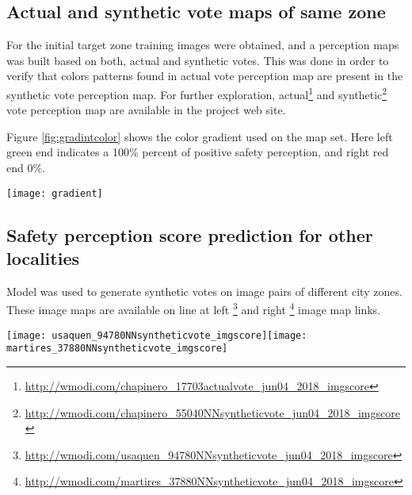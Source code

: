 \documentclass{llncs}
\begin{document}
\subsection{Actual and synthetic vote maps of same zone}
For the initial target zone training images were obtained, and a perception maps was built based on both, actual and synthetic votes. This was done in order to verify that colors patterns found in actual vote perception map are present in the synthetic vote perception map. For further exploration, actual\footnote{\href{http://wmodi.com/chapinero\_17703actualvote\_jun04\_2018\_imgscore}{http://wmodi.com/chapinero\_17703actualvote\_jun04\_2018\_imgscore}} and synthetic\footnote{\href{http://wmodi.com/chapinero\_55040NNsyntheticvote\_jun04\_2018\_imgscore}{http://wmodi.com/chapinero\_55040NNsyntheticvote\_jun04\_2018\_imgscore}} vote perception map are available in the project web site.

Figure \ref{fig:gradintcolor} shows the color gradient used on the map set. Here left green end indicates a 100\% percent of positive safety perception, and right red end 0\%. 

\begin{center}
	\centering
	\texttt{[image: gradient]}
	\label{fig:gradintcolor}
\end{center}

\subsection{Safety perception score prediction for other localities}
Model was used to generate synthetic votes on image pairs of different city zones. These image maps are available on line at left \footnote{\href{http://wmodi.com/usaquen\_94780NNsyntheticvote\_jun04\_2018\_imgscore}{http://wmodi.com/usaquen\_94780NNsyntheticvote\_jun04\_2018\_imgscore}} and right \footnote{\href{http://wmodi.com/martires\_37880NNsyntheticvote\_jun04\_2018\_imgscore}{http://wmodi.com/martires\_37880NNsyntheticvote\_jun04\_2018\_imgscore}} image map links.

\begin{center}
	\centering
	\texttt{[image: usaquen\_94780NNsyntheticvote\_imgscore]}\hspace{1.2mm}\texttt{[image: martires\_37880NNsyntheticvote\_imgscore]}
	\label{fig:zone_predictions}
\end{center}
\end{document}
